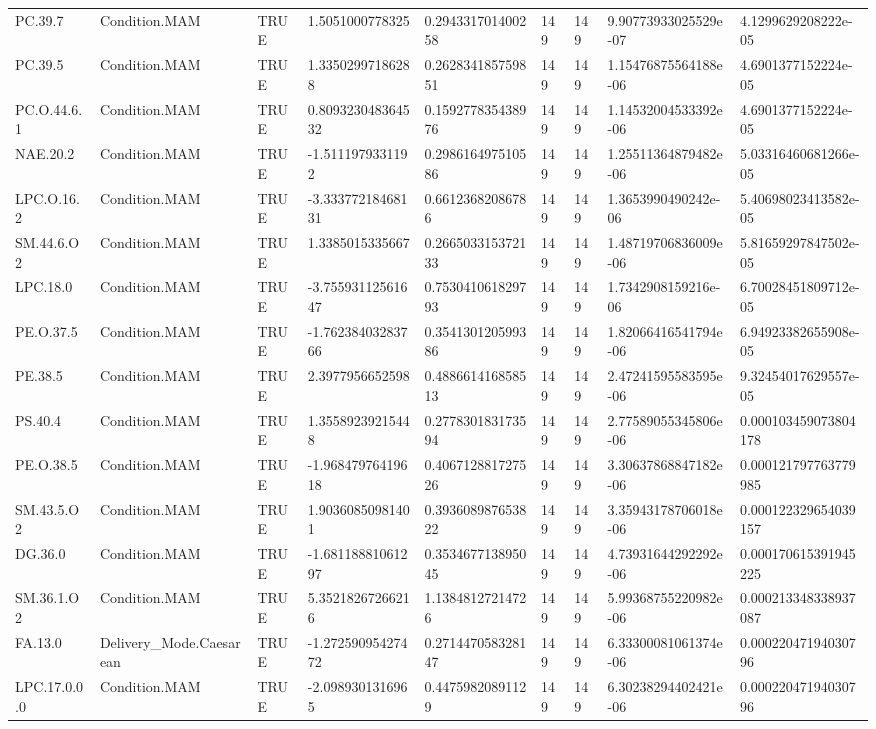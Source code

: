 \begin{longtable}{lllllllll}
PC.39.7 & Condition.MAM & TRUE & 1.5051000778325 & 0.294331701400258 & 149 & 149 & 9.90773933025529e-07 & 4.1299629208222e-05 \\
PC.39.5 & Condition.MAM & TRUE & 1.33502997186288 & 0.262834185759851 & 149 & 149 & 1.15476875564188e-06 & 4.6901377152224e-05 \\
PC.O.44.6.1 & Condition.MAM & TRUE & 0.809323048364532 & 0.159277835438976 & 149 & 149 & 1.14532004533392e-06 & 4.6901377152224e-05 \\
NAE.20.2 & Condition.MAM & TRUE & -1.5111979331192 & 0.298616497510586 & 149 & 149 & 1.25511364879482e-06 & 5.03316460681266e-05 \\
LPC.O.16.2 & Condition.MAM & TRUE & -3.33377218468131 & 0.66123682086786 & 149 & 149 & 1.3653990490242e-06 & 5.40698023413582e-05 \\
SM.44.6.O2 & Condition.MAM & TRUE & 1.3385015335667 & 0.266503315372133 & 149 & 149 & 1.48719706836009e-06 & 5.81659297847502e-05 \\
LPC.18.0 & Condition.MAM & TRUE & -3.75593112561647 & 0.753041061829793 & 149 & 149 & 1.7342908159216e-06 & 6.70028451809712e-05 \\
PE.O.37.5 & Condition.MAM & TRUE & -1.76238403283766 & 0.354130120599386 & 149 & 149 & 1.82066416541794e-06 & 6.94923382655908e-05 \\
PE.38.5 & Condition.MAM & TRUE & 2.3977956652598 & 0.488661416858513 & 149 & 149 & 2.47241595583595e-06 & 9.32454017629557e-05 \\
PS.40.4 & Condition.MAM & TRUE & 1.35589239215448 & 0.277830183173594 & 149 & 149 & 2.77589055345806e-06 & 0.000103459073804178 \\
PE.O.38.5 & Condition.MAM & TRUE & -1.96847976419618 & 0.406712881727526 & 149 & 149 & 3.30637868847182e-06 & 0.000121797763779985 \\
SM.43.5.O2 & Condition.MAM & TRUE & 1.90360850981401 & 0.393608987653822 & 149 & 149 & 3.35943178706018e-06 & 0.000122329654039157 \\
DG.36.0 & Condition.MAM & TRUE & -1.68118881061297 & 0.353467713895045 & 149 & 149 & 4.73931644292292e-06 & 0.000170615391945225 \\
SM.36.1.O2 & Condition.MAM & TRUE & 5.35218267266216 & 1.13848127214726 & 149 & 149 & 5.99368755220982e-06 & 0.000213348338937087 \\
FA.13.0 & Delivery\_Mode.Caesarean & TRUE & -1.27259095427472 & 0.271447058328147 & 149 & 149 & 6.33300081061374e-06 & 0.00022047194030796 \\
LPC.17.0.0.0 & Condition.MAM & TRUE & -2.0989301316965 & 0.44759820891129 & 149 & 149 & 6.30238294402421e-06 & 0.00022047194030796 \\

\end{longtable}
